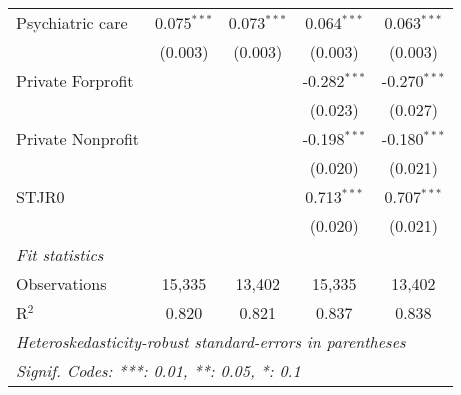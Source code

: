 \begin{tabular}{lcccc}
   Psychiatric care        & 0.075$^{***}$ & 0.073$^{***}$ & 0.064$^{***}$  & 0.063$^{***}$\\   
                           & (0.003)       & (0.003)       & (0.003)        & (0.003)\\   
   Private Forprofit       &               &               & -0.282$^{***}$ & -0.270$^{***}$\\   
                           &               &               & (0.023)        & (0.027)\\   
   Private Nonprofit       &               &               & -0.198$^{***}$ & -0.180$^{***}$\\   
                           &               &               & (0.020)        & (0.021)\\   
   STJR0                   &               &               & 0.713$^{***}$  & 0.707$^{***}$\\   
                           &               &               & (0.020)        & (0.021)\\   
   \midrule
   \emph{Fit statistics}\\
   Observations            & 15,335        & 13,402        & 15,335         & 13,402\\  
   R$^2$                   & 0.820         & 0.821         & 0.837          & 0.838\\  
   \midrule \midrule
   \multicolumn{5}{l}{\emph{Heteroskedasticity-robust standard-errors in parentheses}}\\
   \multicolumn{5}{l}{\emph{Signif. Codes: ***: 0.01, **: 0.05, *: 0.1}}\\
\end{tabular}
\par\endgroup


